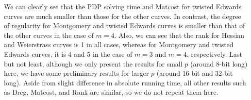 

We can clearly see that the PDP solving time and Matcost for twisted
Edwards curves are much smaller than those for the other curves.
%
In contrast, the degree of regularity for Montgomery and twisted
Edwards curves is smaller than that of the other curves in the case of
$m=4$.
%
Also, we can see that the rank for Hessian and Weierstrass curves is 1
in all cases, whereas for Montgomery and twisted Edwards curves, it is
4 and 5 in the case of $m=3$ and $m=4$, respectively.
%
Last but not least, although we only present the results for small $p$
(around 8-bit long) here, we have some preliminary results for larger
$p$ (around 16-bit and 32-bit long).
%
Aside from slight difference in absolute running time, all other
results such as Dreg, Matcost, and Rank are similar, so we do not
repeat them here.
%







